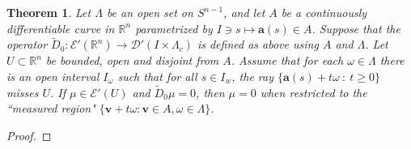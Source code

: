 \documentclass[a4paper,12pt]{amsart}
\numberwithin{equation}{section}
\theoremstyle{plain}
\newtheorem{theorem}{Theorem}
\numberwithin{theorem}{section}
\theoremstyle{definition}
\theoremstyle{remark}
\theoremstyle{remark}
\theoremstyle{remark}
\newcommand{\tred}[1]{{\color{red}#1}}
\newcommand{\va}{\mathbf{a}}
\newcommand{\vv}{{\mathbf{v}}}
\newcommand{\jc}[1]{\begin{quotation}\textbf{James' comment:\
}{\textit{#1}}\end{quotation}}
\begin{document}
{\begin{theorem}
\label{natt}
Let $\Lambda$ be an open set on $S^{n-1}$, and let $A$ be a continuously
differentiable curve in $\mathbb{R}^n$ parametrized by $I \ni s \mapsto \va(s) \in A$. Suppose that the operator $\widetilde{D}_0: \mathcal{E}'(\mathbb{R}^n)\rightarrow \mathcal{D}'(I \times \Lambda_c)$ is defined as above using $A$ and $\Lambda$. Let $U \subset \mathbb{R}^n$ be bounded, open and disjoint from $A$. Assume that for each $\omega \in \Lambda$
there is an open interval $I_\omega$ such that for all $s \in I_w$, the ray $\{\va(s) + t\omega \ :\ t\geq 0\}$ misses $U$. If $\mu \in \mathcal{E}'(U)$ and
$\widetilde{D}_0\mu=0$, then $\mu = 0$ when restricted to the ``measured region"
$\{\vv+t\omega : \vv\in A, \omega \in \Lambda\}$.
\end{theorem}
\begin{proof}



\end{proof}}
\end{document}
